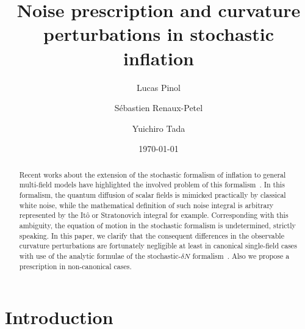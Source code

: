 \documentclass[aps, prd
, preprint
, nofootinbib 
, superscriptaddress
, longbibliography
]{revtex4-1}
\begin{document}
\title{Noise prescription and curvature perturbations in stochastic inflation}
\date{\today}

\author{Lucas Pinol}

\author{S\'ebastien Renaux-Petel}

\author{Yuichiro Tada}


\begin{abstract}
Recent works about the extension of the stochastic formalism of inflation to general multi-field models have highlighted 
the involved problem of this formalism~\cite{Pinol:2018euk,2nd}. In this formalism, the quantum diffusion of scalar fields is mimicked practically by classical white noise,
while the mathematical definition of such noise integral is arbitrary represented by the It\^o or Stratonovich integral for example.
Corresponding with this ambiguity, the equation of motion in the stochastic formalism is undetermined, strictly speaking.
In this paper, we clarify that the consequent differences in the observable curvature perturbations are fortunately negligible at least in canonical single-field cases 
with use of the analytic formulae of the stochastic-$\delta N$ formalism~\cite{Vennin:2015hra}.
Also we propose a prescription in non-canonical cases.
\end{abstract}

\maketitle



\section{Introduction}
\end{document}
